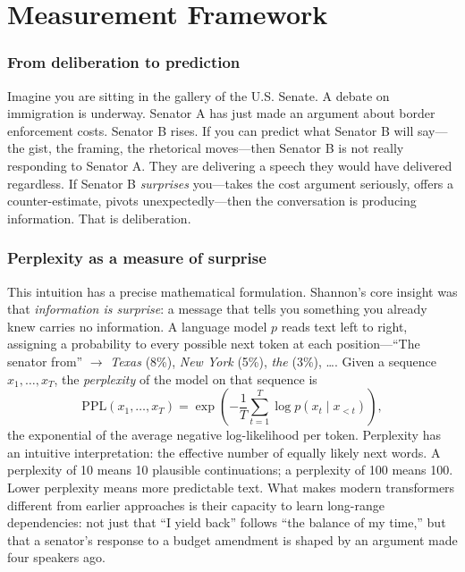 \documentclass[12pt]{article}
\newcommand{\PPL}{\text{PPL}}
\begin{document}
\section{Measurement Framework}
\label{sec:framework}

\subsubsection*{From deliberation to prediction}
Imagine you are sitting in the gallery of the U.S. Senate. A debate on immigration is underway. Senator A has just made an argument about border enforcement costs. Senator B rises. If you can predict what Senator B will say---the gist, the framing, the rhetorical moves---then Senator B is not really responding to Senator A. They are delivering a speech they would have delivered regardless. If Senator B \textit{surprises} you---takes the cost argument seriously, offers a counter-estimate, pivots unexpectedly---then the conversation is producing information. That is deliberation.

\subsubsection*{Perplexity as a measure of surprise}
This intuition has a precise mathematical formulation. Shannon's \citeyearpar{shannon1948} core insight was that \textit{information is surprise}: a message that tells you something you already knew carries no information. A language model $p$ reads text left to right, assigning a probability to every possible next token at each position---``The senator from'' $\rightarrow$ \textit{Texas} (8\%), \textit{New York} (5\%), \textit{the} (3\%), \ldots. Given a sequence $x_1, \ldots, x_T$, the \textit{perplexity} of the model on that sequence is
\begin{equation}
\PPL(x_1, \ldots, x_T) = \exp\!\left(-\frac{1}{T}\sum_{t=1}^{T} \log p(x_t \mid x_{<t})\right),
\label{eq:ppl}
\end{equation}
the exponential of the average negative log-likelihood per token. Perplexity has an intuitive interpretation: the effective number of equally likely next words. A perplexity of 10 means 10 plausible continuations; a perplexity of 100 means 100. Lower perplexity means more predictable text. What makes modern transformers \citep{vaswani2017} different from earlier approaches is their capacity to learn long-range dependencies: not just that ``I yield back'' follows ``the balance of my time,'' but that a senator's response to a budget amendment is shaped by an argument made four speakers ago.
\end{document}
